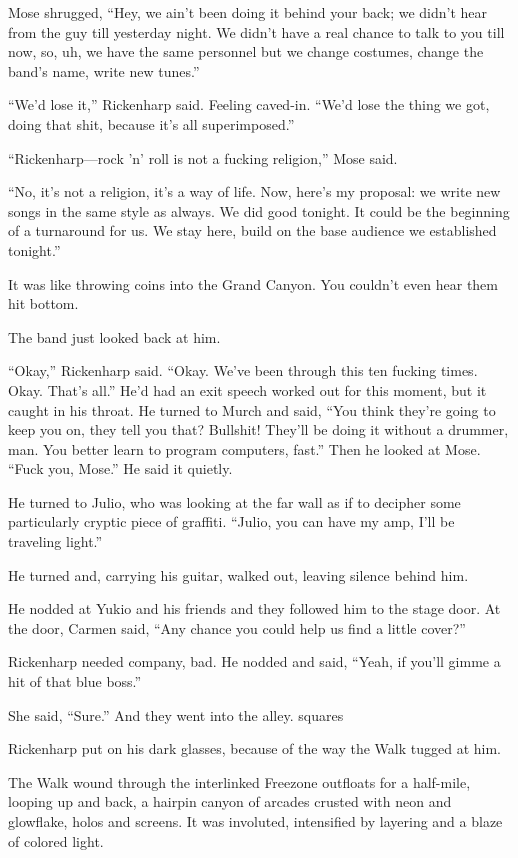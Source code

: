 Mose shrugged, “Hey, we ain’t been doing it behind your back; we didn’t hear from the guy till yesterday night. We didn’t have a real chance to talk to you till now, so, uh, we have the same personnel but we change costumes, change the band’s name, write new tunes.”

“We’d lose it,” Rickenharp said. Feeling caved-in. “We’d lose the thing we got, doing that shit, because it’s all superimposed.”

“Rickenharp—rock ’n’ roll is not a fucking religion,” Mose said.

“No, it’s not a religion, it’s a way of life. Now, here’s my proposal: we write new songs in the same style as always. We did good tonight. It could be the beginning of a turnaround for us. We stay here, build on the base audience we established tonight.”

It was like throwing coins into the Grand Canyon. You couldn’t even hear them hit bottom.

The band just looked back at him.

“Okay,” Rickenharp said. “Okay. We’ve been through this ten fucking times. Okay. That’s all.” He’d had an exit speech worked out for this moment, but it caught in his throat. He turned to Murch and said, “You think they’re going to keep you on, they tell you that? Bullshit! They’ll be doing it without a drummer, man. You better learn to program computers, fast.” Then he looked at Mose. “Fuck you, Mose.” He said it quietly.

He turned to Julio, who was looking at the far wall as if to decipher some particularly cryptic piece of graffiti. “Julio, you can have my amp, I’ll be traveling light.”

He turned and, carrying his guitar, walked out, leaving silence behind him.

He nodded at Yukio and his friends and they followed him to the stage door. At the door, Carmen said, “Any chance you could help us find a little cover?”

Rickenharp needed company, bad. He nodded and said, “Yeah, if you’ll gimme a hit of that blue boss.”

She said, “Sure.” And they went into the alley.
squares

Rickenharp put on his dark glasses, because of the way the Walk tugged at him.

The Walk wound through the interlinked Freezone outfloats for a half-mile, looping up and back, a hairpin canyon of arcades crusted with neon and glowflake, holos and screens. It was involuted, intensified by layering and a blaze of colored light.


